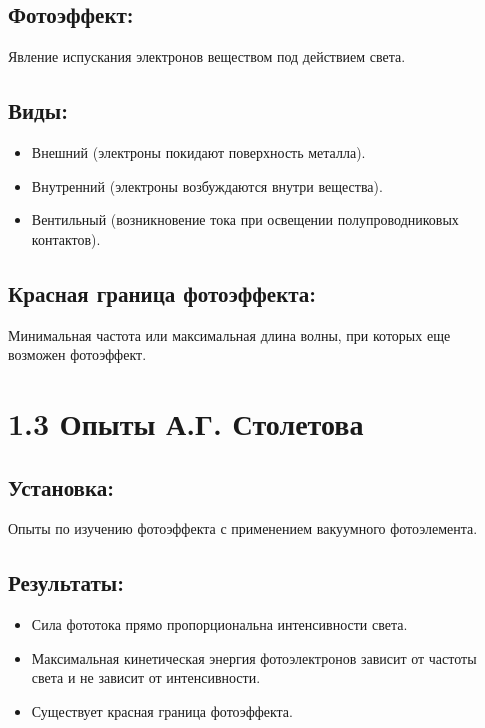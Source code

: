 \documentclass[a4paper,12pt]{article}
\begin{document}
\subsection*{Фотоэффект:}
\vspace{-3pt}
Явление испускания электронов веществом под действием света.

\vspace{-9pt}
\subsection*{Виды:}
\vspace{-3pt}
\begin{itemize}[itemsep=0pt, topsep=0pt, parsep=3pt]
    \item Внешний (электроны покидают поверхность металла).
    \item Внутренний (электроны возбуждаются внутри вещества).
    \item Вентильный (возникновение тока при освещении полупроводниковых контактов).
\end{itemize}

\vspace{-9pt}
\subsection*{Красная граница фотоэффекта:}
\vspace{-3pt}
Минимальная частота или максимальная длина волны, при которых еще возможен фотоэффект.


\section*{1.3 Опыты А.Г. Столетова}
\vspace{-9pt}
\subsection*{Установка:}
\vspace{-3pt}
Опыты по изучению фотоэффекта с применением вакуумного фотоэлемента.

\vspace{-9pt}
\subsection*{Результаты:}
\vspace{-3pt}
\begin{itemize}[itemsep=0pt, topsep=0pt, parsep=3pt]
    \item Сила фототока прямо пропорциональна интенсивности света.
    \item Максимальная кинетическая энергия фотоэлектронов зависит от частоты света и не зависит от интенсивности.
    \item Существует красная граница фотоэффекта.
\end{itemize}
\end{document}
